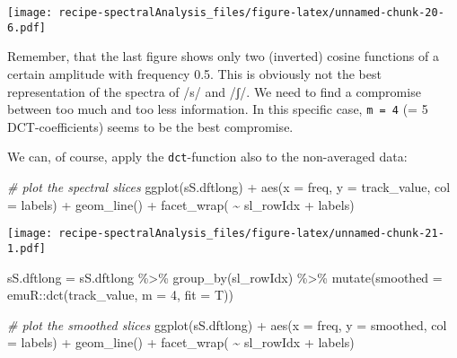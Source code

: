 \documentclass[
]{book}
\newenvironment{Shaded}{\begin{snugshade}}{\end{snugshade}}
\newcommand{\AttributeTok}[1]{\textcolor[rgb]{0.77,0.63,0.00}{#1}}
\newcommand{\CommentTok}[1]{\textcolor[rgb]{0.56,0.35,0.01}{\textit{#1}}}
\newcommand{\DecValTok}[1]{\textcolor[rgb]{0.00,0.00,0.81}{#1}}
\newcommand{\FunctionTok}[1]{\textcolor[rgb]{0.00,0.00,0.00}{#1}}
\newcommand{\NormalTok}[1]{#1}
\newcommand{\OtherTok}[1]{\textcolor[rgb]{0.56,0.35,0.01}{#1}}
\newcommand{\SpecialCharTok}[1]{\textcolor[rgb]{0.00,0.00,0.00}{#1}}
\begin{document}
\texttt{[image: recipe-spectralAnalysis\_files/figure-latex/unnamed-chunk-20-6.pdf]}

Remember, that the last figure shows only two (inverted) cosine functions of a certain amplitude with frequency 0.5. This is obviously not the best representation of the spectra of /s/ and /ʃ/. We need to find a compromise between too much and too less information. In this specific case, \texttt{m\ =\ 4} (= 5 DCT-coefficients) seems to be the best compromise.

We can, of course, apply the \texttt{dct}-function also to the non-averaged data:

\begin{Shaded}
\begin{Highlighting}[]
\CommentTok{\# plot the spectral slices}
\FunctionTok{ggplot}\NormalTok{(sS.dftlong) }\SpecialCharTok{+}
  \FunctionTok{aes}\NormalTok{(}\AttributeTok{x =}\NormalTok{ freq, }\AttributeTok{y =}\NormalTok{ track\_value, }\AttributeTok{col =}\NormalTok{ labels) }\SpecialCharTok{+}
  \FunctionTok{geom\_line}\NormalTok{() }\SpecialCharTok{+}
  \FunctionTok{facet\_wrap}\NormalTok{( }\SpecialCharTok{\textasciitilde{}}\NormalTok{ sl\_rowIdx }\SpecialCharTok{+}\NormalTok{ labels)}
\end{Highlighting}
\end{Shaded}

\texttt{[image: recipe-spectralAnalysis\_files/figure-latex/unnamed-chunk-21-1.pdf]}

\begin{Shaded}
\begin{Highlighting}[]
\NormalTok{sS.dftlong }\OtherTok{=}\NormalTok{ sS.dftlong }\SpecialCharTok{\%\textgreater{}\%}
  \FunctionTok{group\_by}\NormalTok{(sl\_rowIdx) }\SpecialCharTok{\%\textgreater{}\%}
  \FunctionTok{mutate}\NormalTok{(}\AttributeTok{smoothed =}\NormalTok{ emuR}\SpecialCharTok{::}\FunctionTok{dct}\NormalTok{(track\_value, }\AttributeTok{m =} \DecValTok{4}\NormalTok{, }\AttributeTok{fit =}\NormalTok{ T))}

\CommentTok{\# plot the smoothed slices}
\FunctionTok{ggplot}\NormalTok{(sS.dftlong) }\SpecialCharTok{+}
  \FunctionTok{aes}\NormalTok{(}\AttributeTok{x =}\NormalTok{ freq, }\AttributeTok{y =}\NormalTok{ smoothed, }\AttributeTok{col =}\NormalTok{ labels) }\SpecialCharTok{+}
  \FunctionTok{geom\_line}\NormalTok{() }\SpecialCharTok{+}
  \FunctionTok{facet\_wrap}\NormalTok{( }\SpecialCharTok{\textasciitilde{}}\NormalTok{ sl\_rowIdx }\SpecialCharTok{+}\NormalTok{ labels)}
\end{Highlighting}
\end{Shaded}
\end{document}
